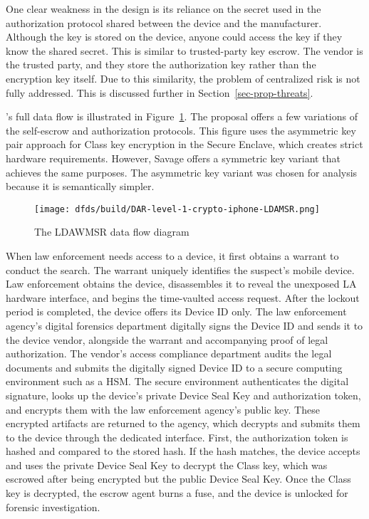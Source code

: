 \documentclass[manuscript,screen,review]{acmart}
\newcommand{\myfig}[1]{Figure~\ref{#1}}
\newcommand{\mysec}[1]{Section~\ref{#1}}
\begin{document}
One clear weakness in the design is its reliance on the secret used in the authorization protocol shared between the
device and the manufacturer. Although the key is stored on the device, anyone could access the key if they know the
shared secret. This is similar to trusted-party key escrow. The vendor is the trusted party, and they store the
authorization key rather than the encryption key itself. Due to this similarity, the problem of centralized risk is not
fully addressed. This is discussed further in \mysec{sec-prop-threats}.

\ldawmsR's full data flow is illustrated in \myfig{fig-dfd-ldawmsr}. The proposal offers a few variations of the
self-escrow and authorization protocols. This figure uses the asymmetric key pair approach for Class key encryption in
the Secure Enclave, which creates strict hardware requirements. However, Savage offers a symmetric key variant that
achieves the same purposes. The asymmetric key variant was chosen for analysis because it is semantically simpler.

\begin{figure}[p]
    \centering
    \texttt{[image: dfds/build/DAR-level-1-crypto-iphone-LDAMSR.png]}
    \caption{The LDAWMSR data flow diagram}
    \label{fig-dfd-ldawmsr}
\end{figure}

When law enforcement needs access to a device, it first obtains a warrant to conduct the search. The warrant uniquely
identifies the suspect's mobile device. Law enforcement obtains the device, disassembles it to reveal the unexposed
\ac{LA} hardware interface, and begins the time-vaulted access request. After the lockout period is completed, the
device offers its Device ID only. The law enforcement agency's digital forensics department digitally signs the Device
ID and sends it to the device vendor, alongside the warrant and accompanying proof of legal authorization. The vendor's
access compliance department audits the legal documents and submits the digitally signed Device ID to a secure computing
environment such as a \ac{HSM}. The secure environment authenticates the digital signature, looks up the device's
private Device Seal Key and authorization token, and encrypts them with the law enforcement agency's public key. These
encrypted artifacts are returned to the agency, which decrypts and submits them to the device through the dedicated
interface. First, the authorization token is hashed and compared to the stored hash. If the hash matches, the device
accepts and uses the private Device Seal Key to decrypt the Class key, which was escrowed after being encrypted but the
public Device Seal Key. Once the Class key is decrypted, the escrow agent burns a fuse, and the device is unlocked for
forensic investigation.
\end{document}
